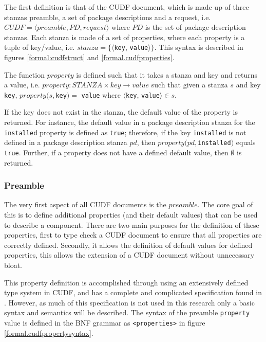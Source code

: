 The first definition is that of the CUDF document, which is made up of three stanzas preamble, a set of package descriptions and a request, 
i.e. $CUDF = \langle preamble, PD, request \rangle$ where $PD$ is the set of package description stanzas.
Each stanza is made of a set of properties, where each property is a tuple of key/value, i.e. $stanza = \{\langle $\verb+key+, \verb+value+$\rangle\}$.
This syntax is described in figures \ref{formal:cudfstruct} and \ref{formal.cudfproperties}.

The function $property$ is defined such that it takes a stanza and key and returns a value,
i.e. $property: STANZA \times key \rightarrow value$ such that given a stanza $s$ and key \verb+key+,
$property(s,$\verb+key+$) = $ \verb+value+ where $\langle$\verb+key+, \verb+value+$ \rangle \in s$.

If the key does not exist in the stanza, the default value of the property is returned.
For instance, the default value in a package description stanza for the \verb+installed+ property is defined as \verb+true+;
therefore, if the key \verb+installed+ is not defined in a package description stanza $pd$, then $property(pd,$\verb+installed+$)$ equals \verb+true+.
Further, if a property does not have a defined default value, then $\emptyset$ is returned.

\subsubsection{Preamble}
The very first aspect of all CUDF documents is the $preamble$.
The core goal of this is to define additional properties (and their default values) that can be used to describe a component.
There are two main purposes for the definition of these properties, first to type check a CUDF document to ensure that all properties are correctly defined.
Secondly, it allows the definition of default values for defined properties, this allows the extension of a CUDF document without unnecessary bloat.  

This property definition is accomplished through using an extensively defined type system in CUDF, and has a complete and complicated specification found in \cite{treinen2009common}.
However, as much of this specification is not used in this research only a basic syntax and semantics will be described.
The syntax of the preamble \verb+property+ value is defined in the BNF grammar as \verb+<properties>+ in figure \ref{formal.cudfpropertysyntax}.

